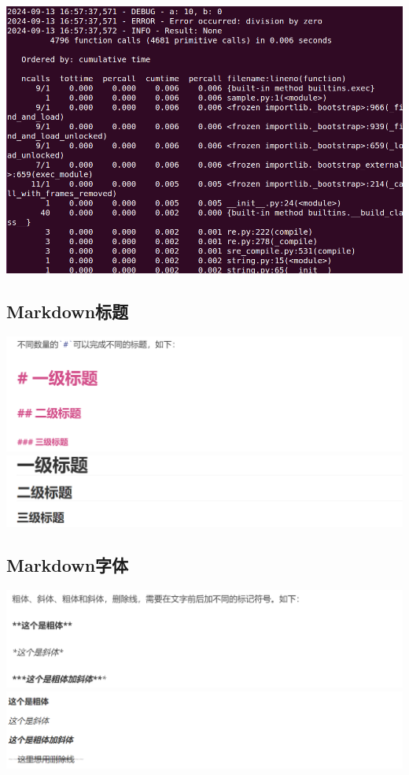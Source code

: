 \documentclass[UTF8,a4paper]{ctexart}
\begin{document}
\begin{sloppypar}
	\includegraphics[width = 16cm]{4}
	
	\subsection{Markdown标题}
	
	\includegraphics[width = 16cm]{51}
	\includegraphics[width = 16cm]{52}
	
	\subsection{Markdown字体}

	\includegraphics[width = 16cm]{61}
	\includegraphics[width = 16cm]{62}
	

\end{sloppypar}
\end{document}
